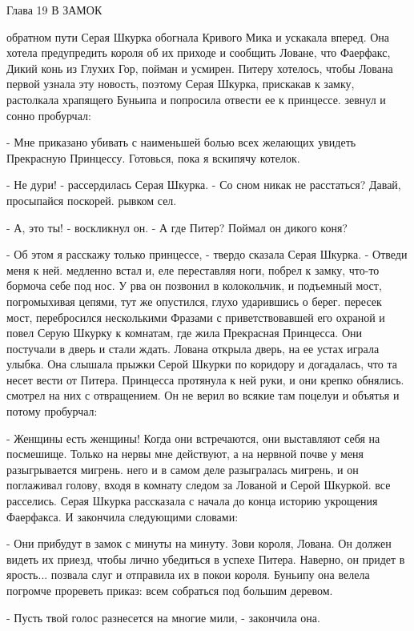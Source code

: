 Глава 19
 В ЗАМОК
\par{} обратном пути Серая Шкурка обогнала Кривого Мика и ускакала 
вперед. Она хотела предупредить короля об их приходе и сообщить 
Ловане, что Фаерфакс, Дикий конь из Глухих Гор, пойман и усмирен. 
Питеру хотелось, чтобы Лована первой узнала эту новость, поэтому Серая 
Шкурка, прискакав к замку, растолкала храпящего Буньипа и попросила 
отвести ее к принцессе.
 зевнул и сонно пробурчал:
\par- Мне приказано убивать с наименьшей болью всех желающих увидеть 
Прекрасную Принцессу. Готовься, пока я вскипячу котелок.
\par- Не дури! - рассердилась Серая Шкурка. - Со сном никак не 
расстаться? Давай, просыпайся поскорей.
 рывком сел.
\par- А, это ты! - воскликнул он. - А где Питер? Поймал он дикого 
коня?
\par- Об этом я расскажу только принцессе, - твердо сказала Серая 
Шкурка. - Отведи меня к ней.
 медленно встал и, еле переставляя ноги, побрел к замку, 
что-то бормоча себе под нос. У рва он позвонил в колокольчик, и 
подъемный мост, погромыхивая цепями, тут же опустился, глухо 
ударившись о берег.
 пересек мост, перебросился несколькими Фразами с 
приветствовавшей его охраной и повел Серую Шкурку к комнатам, где жила 
Прекрасная Принцесса. Они постучали в дверь и стали ждать.
 Лована открыла дверь, на ее устах играла улыбка. Она слышала 
прыжки Серой Шкурки по коридору и догадалась, что та несет вести от 
Питера. Принцесса протянула к ней руки, и они крепко обнялись.
 смотрел на них с отвращением. Он не верил во всякие там 
поцелуи и объятья и потому пробурчал:
\par- Женщины есть женщины! Когда они встречаются, они выставляют себя 
на посмешище. Только на нервы мне действуют, а на нервной почве у меня 
разыгрывается мигрень.
 него и в самом деле разыгралась мигрень, и он поглаживал голову, 
входя в комнату следом за Лованой и Серой Шкуркой.
 все расселись. Серая Шкурка рассказала с начала до конца 
историю укрощения Фаерфакса. И закончила следующими словами:
\par- Они прибудут в замок с минуты на минуту. Зови короля, Лована. Он 
должен видеть их приезд, чтобы лично убедиться в успехе Питера. 
Наверно, он придет в ярость...
 позвала слуг и отправила их в покои короля. Буньипу она 
велела погромче прореветь приказ: всем собраться под большим деревом.
\par- Пусть твой голос разнесется на многие мили, - закончила она.

